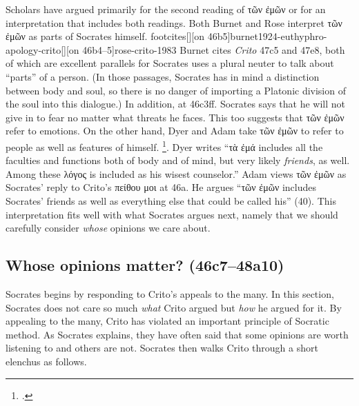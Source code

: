 \documentclass[12pt,letterpaper]{article}
\begin{document}
Scholars have argued primarily for the second reading of \textgreek{τῶν ἐμῶν} or for an interpretation that includes both readings.
Both Burnet and Rose interpret \textgreek{τῶν ἐμῶν} as parts of Socrates himself.%
footcites[][on 46b5]{burnet1924-euthyphro-apology-crito}[][on 46b4--5]{rose-crito-1983} Burnet cites \textit{Crito} 47c5 and 47e8, both of which are excellent parallels for Socrates uses a plural neuter to talk about ``parts'' of a person.
(In those passages, Socrates has in mind a distinction between body and soul, so there is no danger of importing a Platonic division of the soul into this dialogue.)
In addition, at 46c3ff. Socrates says that he will not give in to fear no matter what threats he faces.
This too suggests that \textgreek{τῶν ἐμῶν} refer to emotions.
On the other hand, Dyer and Adam take \textgreek{τῶν ἐμῶν} to refer to people as well as features of himself.%
\footcites[][on 46b5]{dyer-apology-crito-2007}[][on 46b6]{adam1988-crito}.
Dyer writes ``\textgreek{τὰ ἐμά} includes all the faculties and functions both of body and of mind, but very likely \textit{friends}, as well.
Among these \textgreek{λόγος} is included as his wisest counselor.''
Adam views \textgreek{τῶν ἐμῶν} as Socrates' reply to Crito's \textgreek{πείθου μοι} at 46a.
He argues ``\textgreek{τῶν ἐμῶν} includes Socrates' friends as well as everything else that could be called his'' (40).
This interpretation fits well with what Socrates argues next, namely that we should carefully consider \textit{whose} opinions we care about.

\subsection*{Whose opinions matter? (46c7--48a10)}

Socrates begins by responding to Crito's appeals to the many.
In this section, Socrates does not care so much \emph{what} Crito argued but \emph{how} he argued for it.
By appealing to the many, Crito has violated an important principle of Socratic method.
As Socrates explains, they have often said that some opinions are worth listening to and others are not.
Socrates then walks Crito through a short elenchus as follows.
\end{document}
